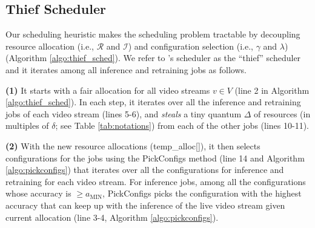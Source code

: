 \subsection{Thief Scheduler}
\label{subsec:thief}




Our scheduling heuristic makes the scheduling problem tractable by decoupling resource allocation (i.e., $\mathcal{R}$ and $\mathcal{I}$) and configuration selection (i.e., $\gamma$ and $\lambda$) (Algorithm \ref{algo:thief_sched}). %
We refer to {\name}'s scheduler as the ``thief'' scheduler and it iterates among all inference and retraining jobs as follows.%

{\bf (1)} It starts with a fair allocation for all video streams $v \in V$ (line 2 in Algorithm \ref{algo:thief_sched}). 
In each step, it iterates over all the inference and retraining jobs of each video stream (lines 5-6), and {\em steals} a tiny quantum $\Delta$ of resources (in multiples of $\delta$; see Table \ref{tab:notations}) from each of the other jobs (lines 10-11).

{\bf (2)} With the new resource allocations ({temp\_alloc[]}), it then selects configurations for the jobs using the {\sf\footnotesize PickConfigs} method (line 14 and Algorithm \ref{algo:pickconfigs}) that iterates over all the configurations for inference and retraining for each video stream.  
For inference jobs, among all the configurations whose accuracy is $\geq a_\text{MIN}$, {\sf\footnotesize PickConfigs} picks the configuration with the highest accuracy that can keep up with the inference of the live video stream given current allocation (line 3-4, Algorithm \ref{algo:pickconfigs}).  

